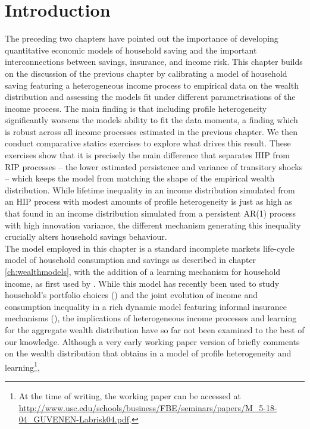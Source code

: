 \section{Introduction}
The preceding two chapters have pointed out the importance of developing quantitative
economic models of household saving and the important interconnections between
savings, insurance, and income risk. This chapter builds on the discussion of 
the previous chapter by calibrating a model of household saving featuring a
heterogeneous income process to empirical data on the wealth distribution and
assessing the models fit under different parametrisations of the income process.
The main finding is that including profile heterogeneity significantly worsens
the models ability to fit the data moments, a finding which is robust across
all income processes estimated in the previous chapter. We then conduct comparative
statics exercises to explore what drives this result. These exercises show that
it is precisely the main difference that separates HIP from RIP processes --
the lower estimated persistence and variance of transitory shocks -- which 
keeps the model from matching the shape of the empirical wealth distribution. 
While lifetime inequality in an income distribution simulated from an HIP process
with modest amounts of profile heterogeneity is just as high as that found in an
income distribution simulated from a persistent AR(1) process with high innovation
variance, the different mechanism generating this inequality crucially alters
household savings behaviour. 
\vspace{0.5cm}   \\
The model employed  in this chapter is a standard incomplete markets life-cycle 
model of household  
consumption and savings as described in chapter \ref{ch:wealthmodels}, with the
addition of a learning mechanism for household income, as first used by 
\citet{Guvenen2007}. While this model has recently been used to study household's
portfolio choices (\citealt{ChangHongKarabarbounis2015}) and the joint evolution 
of income and consumption inequality in a rich dynamic model featuring informal
insurance mechanisms (\citealt{GuvenenSmith2014}), the implications of heterogeneous
income processes and learning for the aggregate wealth distribution have so far
not been examined to the best of our knowledge.
Although a very early working paper version of \citet{Guvenen2007} briefly comments
on the wealth distribution that obtains in a model of profile heterogeneity and
learning\footnote{At the time of writing, the working paper can be accessed at
\url{http://www.usc.edu/schools/business/FBE/seminars/papers/M_5-18-04_GUVENEN-Labrisk04.pdf}.},
